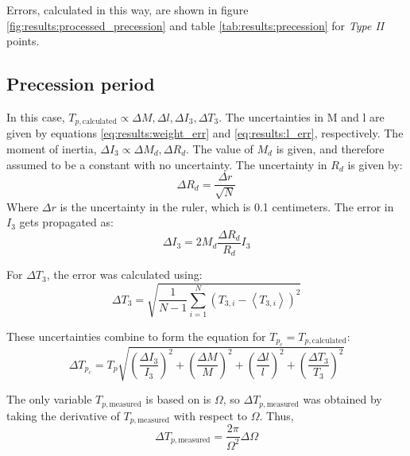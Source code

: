 \begin{multicols}{2}
Errors, calculated in this way, are shown in figure \ref{fig:results:processed_precession} and table \ref{tab:results:precession} for \emph{Type II} points.

\subsection{Precession period}
  In this case, $T_{p, \text{calculated}} \propto \Delta M, \Delta l, \Delta I_3, \Delta T_3$. The uncertainties in M and l are given by equations \ref{eq:results:weight_err} and \ref{eq:results:l_err}, respectively. The moment of inertia, $\Delta I_3 \propto \Delta M_d, \Delta R_d$. The value of $M_d$ is given, and therefore assumed to be a constant with no uncertainty. The uncertainty in $R_d$ is given by:
\begin{equation*}
    \Delta R_d = \frac{\Delta r}{\sqrt{N}}
\end{equation*}
Where $\Delta r$ is the uncertainty in the ruler, which is 0.1 centimeters. The error in $I_3$ gets propagated as:
\begin{equation*}
  \Delta I_3 = 2M_d \frac{\Delta R_d}{R_d}I_3
\end{equation*}

For $\Delta T_3$, the error was calculated using:
\begin{equation*}
  \Delta T_3 = \sqrt{\frac{1}{N-1} \sum_{i=1}^N (T_{3, i} - \left< T_{3, i} \right> )^2}
\end{equation*}

These uncertainties combine to form the equation for $T_{p_{c}} = T_{p, \text{calculated}}$:
\begin{equation*}
  \Delta T_{p_{c}} = T_p \sqrt{\left(\frac{\Delta I_3}{I_3}\right)^2 + \left(\frac{\Delta M}{M}\right)^2 + \left(\frac{\Delta l}{l}\right)^2 + \left(\frac{\Delta T_3}{T_3}\right)^2}
\end{equation*}

The only variable $T_{p, \text{measured}}$ is based on is $\Omega$, so $\Delta T_{p, \text{measured}}$ was obtained by taking the derivative of $T_{p, \text{measured}}$ with respect to $\Omega$. Thus,
\begin{equation*}
  \Delta T_{p, \text{measured}} = \frac{2\pi}{\Omega^2}\Delta \Omega
\end{equation*}

\end{multicols}
